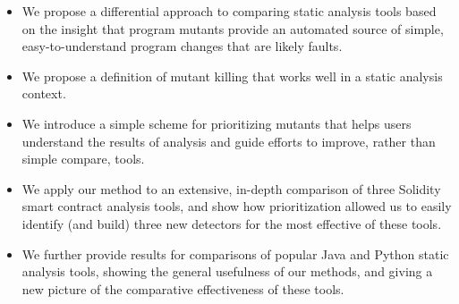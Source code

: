 \begin{itemize}
\item We propose a differential approach to comparing static analysis tools based on the insight that program mutants provide an automated source of simple, easy-to-understand program changes that are likely faults.
\item We propose a definition of mutant killing that works well in a static analysis context.
\item We introduce a simple scheme for prioritizing mutants that helps users understand the results of analysis and guide efforts to improve, rather than simple compare, tools.
\item We apply our method to an extensive, in-depth comparison of three Solidity smart contract analysis tools, and show how prioritization allowed us to easily identify (and build) three new detectors for the most effective of these tools.
\item We further provide results for comparisons of popular Java and Python static analysis tools, showing the general usefulness of our methods, and giving a new picture of the comparative effectiveness of these tools.
\end{itemize}